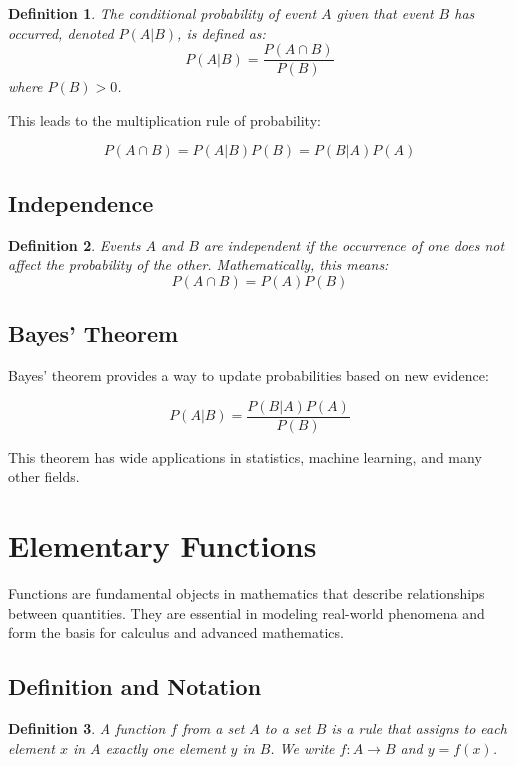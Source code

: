 \documentclass[12pt,a4paper]{article}
\newtheorem{definition}{Definition}
\begin{document}
\begin{definition}
The conditional probability of event $A$ given that event $B$ has occurred, denoted $P(A|B)$, is defined as:
\[ P(A|B) = \frac{P(A \cap B)}{P(B)} \]
where $P(B) > 0$.
\end{definition}

This leads to the multiplication rule of probability:

\[ P(A \cap B) = P(A|B)P(B) = P(B|A)P(A) \]

\subsection{Independence}

\begin{definition}
Events $A$ and $B$ are independent if the occurrence of one does not affect the probability of the other. Mathematically, this means:
\[ P(A \cap B) = P(A)P(B) \]
\end{definition}

\subsection{Bayes' Theorem}

Bayes' theorem provides a way to update probabilities based on new evidence:

\[ P(A|B) = \frac{P(B|A)P(A)}{P(B)} \]

This theorem has wide applications in statistics, machine learning, and many other fields.

\section{Elementary Functions}

Functions are fundamental objects in mathematics that describe relationships between quantities. They are essential in modeling real-world phenomena and form the basis for calculus and advanced mathematics.

\subsection{Definition and Notation}

\begin{definition}
A function $f$ from a set $A$ to a set $B$ is a rule that assigns to each element $x$ in $A$ exactly one element $y$ in $B$. We write $f: A \to B$ and $y = f(x)$.
\end{definition}
\end{document}
